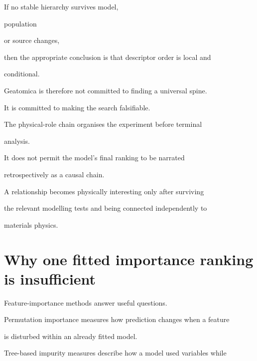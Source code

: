 \documentclass[11pt,a4paper,oneside]{report}
\begin{document}
If no stable hierarchy survives model,

population

or source changes,

then the appropriate conclusion is that descriptor order is local and

conditional.



Geatomica is therefore not committed to finding a universal spine.



It is committed to making the search falsifiable.





\begin{claimboundary}



The physical-role chain organises the experiment before terminal

analysis.



It does not permit the model's final ranking to be narrated

retrospectively as a causal chain.



A relationship becomes physically interesting only after surviving

the relevant modelling tests and being connected independently to

materials physics.



\end{claimboundary}





\section{Why one fitted importance ranking is insufficient}



Feature-importance methods answer useful questions.



Permutation importance measures how prediction changes when a feature

is disturbed within an already fitted model.



Tree-based impurity measures describe how a model used variables while
\end{document}
